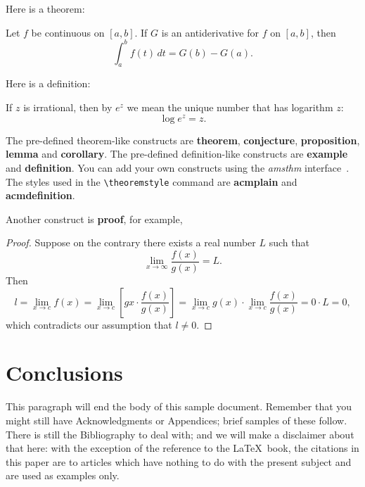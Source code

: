 Here is a theorem:
\begin{theorem}
  Let $f$ be continuous on $[a,b]$.  If $G$ is
  an antiderivative for $f$ on $[a,b]$, then
  \begin{displaymath}
    \int^b_af(t)\,dt = G(b) - G(a).
  \end{displaymath}
\end{theorem}

Here is a definition:
\begin{definition}
  If $z$ is irrational, then by $e^z$ we mean the
  unique number that has
  logarithm $z$:
  \begin{displaymath}
    \log e^z = z.
  \end{displaymath}
\end{definition}

The pre-defined theorem-like constructs are \textbf{theorem},
\textbf{conjecture}, \textbf{proposition}, \textbf{lemma} and
\textbf{corollary}.  The pre-defined de\-fi\-ni\-ti\-on-like constructs are
\textbf{example} and \textbf{definition}.  You can add your own
constructs using the \textsl{amsthm} interface~\cite{Amsthm15}.  The
styles used in the \verb|\theoremstyle| command are \textbf{acmplain}
and \textbf{acmdefinition}.

Another construct is \textbf{proof}, for example,

\begin{proof}
  Suppose on the contrary there exists a real number $L$ such that
  \begin{displaymath}
    \lim_{x\rightarrow\infty} \frac{f(x)}{g(x)} = L.
  \end{displaymath}
  Then
  \begin{displaymath}
    l=\lim_{x\rightarrow c} f(x)
    = \lim_{x\rightarrow c}
    \left[ g{x} \cdot \frac{f(x)}{g(x)} \right ]
    = \lim_{x\rightarrow c} g(x) \cdot \lim_{x\rightarrow c}
    \frac{f(x)}{g(x)} = 0\cdot L = 0,
  \end{displaymath}
  which contradicts our assumption that $l\neq 0$.
\end{proof}

\section{Conclusions}
This paragraph will end the body of this sample document.
Remember that you might still have Acknowledgments or
Appendices; brief samples of these
follow.  There is still the Bibliography to deal with; and
we will make a disclaimer about that here: with the exception
of the reference to the \LaTeX\ book, the citations in
this paper are to articles which have nothing to
do with the present subject and are used as
examples only.



